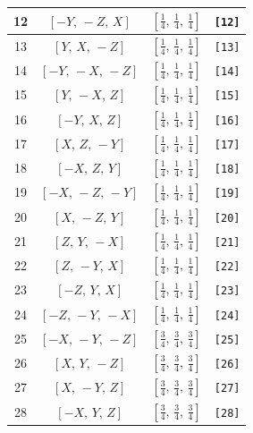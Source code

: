 \documentclass[fleqn,8pt]{jsarticle}
\begin{document}
\begin{longtable}{cccc}
12 & $\left[ - Y,\, - Z,\, X \right]$ & $\left[ \frac{1}{4},\, \frac{1}{4},\, \frac{1}{4} \right]$ & {\tt [12]} \\ \hline
13 & $\left[ Y,\, X,\, - Z \right]$ & $\left[ \frac{1}{4},\, \frac{1}{4},\, \frac{1}{4} \right]$ & {\tt [13]} \\ \hline
14 & $\left[ - Y,\, - X,\, - Z \right]$ & $\left[ \frac{1}{4},\, \frac{1}{4},\, \frac{1}{4} \right]$ & {\tt [14]} \\ \hline
15 & $\left[ Y,\, - X,\, Z \right]$ & $\left[ \frac{1}{4},\, \frac{1}{4},\, \frac{1}{4} \right]$ & {\tt [15]} \\ \hline
16 & $\left[ - Y,\, X,\, Z \right]$ & $\left[ \frac{1}{4},\, \frac{1}{4},\, \frac{1}{4} \right]$ & {\tt [16]} \\ \hline
17 & $\left[ X,\, Z,\, - Y \right]$ & $\left[ \frac{1}{4},\, \frac{1}{4},\, \frac{1}{4} \right]$ & {\tt [17]} \\ \hline
18 & $\left[ - X,\, Z,\, Y \right]$ & $\left[ \frac{1}{4},\, \frac{1}{4},\, \frac{1}{4} \right]$ & {\tt [18]} \\ \hline
19 & $\left[ - X,\, - Z,\, - Y \right]$ & $\left[ \frac{1}{4},\, \frac{1}{4},\, \frac{1}{4} \right]$ & {\tt [19]} \\ \hline
20 & $\left[ X,\, - Z,\, Y \right]$ & $\left[ \frac{1}{4},\, \frac{1}{4},\, \frac{1}{4} \right]$ & {\tt [20]} \\ \hline
21 & $\left[ Z,\, Y,\, - X \right]$ & $\left[ \frac{1}{4},\, \frac{1}{4},\, \frac{1}{4} \right]$ & {\tt [21]} \\ \hline
22 & $\left[ Z,\, - Y,\, X \right]$ & $\left[ \frac{1}{4},\, \frac{1}{4},\, \frac{1}{4} \right]$ & {\tt [22]} \\ \hline
23 & $\left[ - Z,\, Y,\, X \right]$ & $\left[ \frac{1}{4},\, \frac{1}{4},\, \frac{1}{4} \right]$ & {\tt [23]} \\ \hline
24 & $\left[ - Z,\, - Y,\, - X \right]$ & $\left[ \frac{1}{4},\, \frac{1}{4},\, \frac{1}{4} \right]$ & {\tt [24]} \\ \hline
25 & $\left[ - X,\, - Y,\, - Z \right]$ & $\left[ \frac{3}{4},\, \frac{3}{4},\, \frac{3}{4} \right]$ & {\tt [25]} \\ \hline
26 & $\left[ X,\, Y,\, - Z \right]$ & $\left[ \frac{3}{4},\, \frac{3}{4},\, \frac{3}{4} \right]$ & {\tt [26]} \\ \hline
27 & $\left[ X,\, - Y,\, Z \right]$ & $\left[ \frac{3}{4},\, \frac{3}{4},\, \frac{3}{4} \right]$ & {\tt [27]} \\ \hline
28 & $\left[ - X,\, Y,\, Z \right]$ & $\left[ \frac{3}{4},\, \frac{3}{4},\, \frac{3}{4} \right]$ & {\tt [28]} \\ \hline

\end{longtable}
\end{document}
